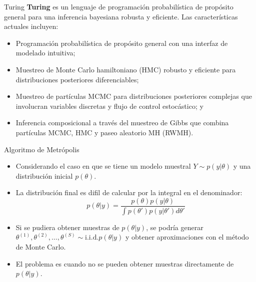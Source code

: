 \documentclass[11pt]{beamer}
\begin{document}
\begin{frame}{Turing}
\textbf{Turing} es un lenguaje de programación probabilística de propósito general para una inferencia bayesiana robusta y eficiente. Las características actuales incluyen:

	\begin{itemize}
		\item Programación probabilística de propósito general con una interfaz de modelado intuitiva;
		\item Muestreo de Monte Carlo hamiltoniano (HMC) robusto y eficiente para distribuciones posteriores diferenciables;
		\item 
Muestreo de partículas MCMC para distribuciones posteriores complejas que involucran variables discretas y flujo de control estocástico; y
		\item 
Inferencia composicional a través del muestreo de Gibbs que combina partículas MCMC, HMC y paseo aleatorio MH (RWMH).
	\end{itemize}
\end{frame}


\begin{frame}{Algoritmo de Metrópolis }

\begin{itemize}
	\item Considerando el caso en que se tiene un modelo muestral $Y \sim p(y|\theta)$ y una distribución inicial $p(\theta)$.
	\item La distribución final es difil de calcular por la integral en el denominador:
		 \begin{equation}
		 	p(\theta | y) =  \dfrac{p(\theta)p(y | \theta)}{\int p(\theta{'}) p(y|\theta{'})d\theta{'}}
		 \end{equation}
	\item Si se pudiera obtener muestras de $p(\theta|y)$, se podría generar $\theta^{(1)},\theta^{(2)}, \hdots, \theta^{(S)} \sim \text{i.i.d}. p(\theta | y)$ y obtener aproximaciones con el método de Monte Carlo.
	\item El problema es cuando no se pueden obtener muestras directamente de $p(\theta | y)$.
\end{itemize}
\end{frame}
\end{document}
